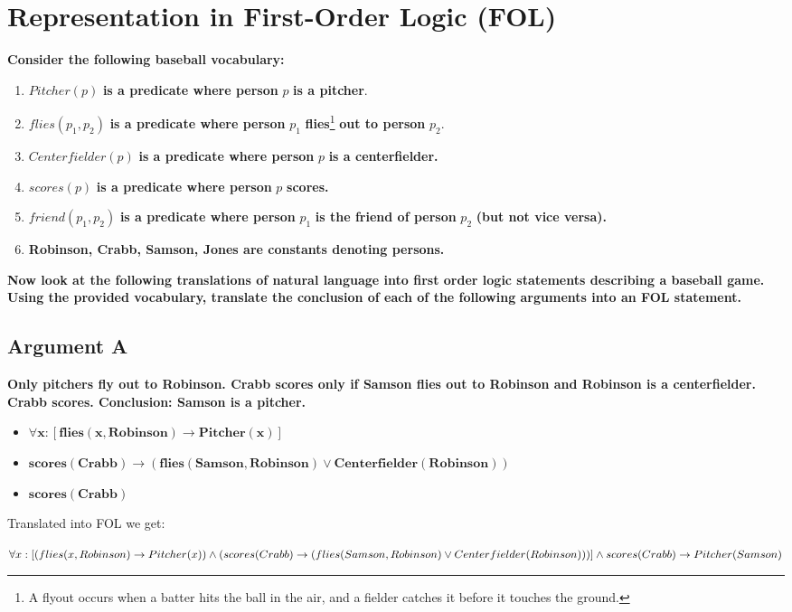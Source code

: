 \section{Representation in First-Order Logic (FOL)}
\begin{large}
    \textbf{Consider the following baseball vocabulary:}
    \begin{enumerate}
        \item $Pitcher(p)$ \textbf{is a predicate where person} $p$ \textbf{is a pitcher}.
        \item $flies(p_1, p_2)$ \textbf{is a predicate where person} $p_1$ \textbf{flies}\footnote{A flyout occurs when a batter hits the ball in the air, and a fielder catches it before it touches the ground.} \textbf{ out to person }$p_2$.
        \item $Centerfielder(p)$ \textbf{is a predicate where person} $p$ \textbf{is a centerfielder.}
        \item $scores(p)$ \textbf{is a predicate where person} $p$\textbf{ scores.}
        \item $friend(p_1, p_2)$ \textbf{is a predicate where person }$p_1$\textbf{ is the friend of person} $p_2$ \textbf{(but not vice versa).}
        \item \textbf{Robinson, Crabb, Samson, Jones are constants denoting persons.}
    \end{enumerate}
    \textbf{Now look at the following translations of natural language into first order logic statements describing
        a baseball game. Using the provided vocabulary, translate the conclusion of each of the
        following arguments into an FOL statement.}
\end{large}

\subsection{Argument A}
\begin{large}
    \textbf{Only pitchers fly out to Robinson. Crabb scores only if Samson flies out to Robinson and Robinson is a
        centerfielder. Crabb scores.
        Conclusion: Samson is a pitcher.}\
    \begin{itemize}
        \item $\mathbf{\forall x : [flies(x, Robinson) \rightarrow Pitcher(x)]}$
        \item $\mathbf{scores(Crabb) \rightarrow (flies(Samson, Robinson) \lor Centerfielder(Robinson))}$
        \item $\mathbf{scores(Crabb)}$
    \end{itemize}

    Translated into FOL we get:

    $\forall x : [(flies(x, Robinson) \rightarrow Pitcher(x)) \\
        \land (scores(Crabb) \rightarrow (flies(Samson, Robinson) \lor Centerfielder(Robinson)))] \\
        \land scores(Crabb) \\
        \rightarrow Pitcher(Samson)$
\end{large}


